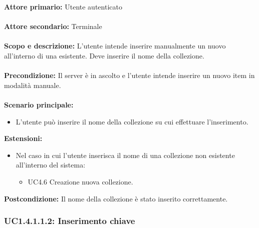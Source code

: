 \documentclass{scalatekids-article}
\begin{document}
\textbf{Attore primario:} Utente autenticato\\ \\
\textbf{Attore secondario:} Terminale\\ \\
\textbf{Scopo e descrizione:} L'utente intende inserire manualmente un nuovo  all'interno di una  esistente. Deve inserire il nome della collezione.\\ \\
\textbf{Precondizione:} Il server è in ascolto e l'utente intende inserire un nuovo item in modalità manuale.\\ \\
\textbf{Scenario principale:}
\begin{itemize}
\item L'utente può inserire il nome della collezione su cui effettuare l'inserimento.
\end{itemize}
\textbf{Estensioni:}
\begin{itemize}
\item Nel caso in cui l'utente inserisca il nome di una collezione non esistente all'interno del sistema:
  \begin{itemize}
  \item UC4.6 Creazione nuova collezione.
  \end{itemize}
\end{itemize}
\textbf{Postcondizione:} Il nome della collezione è stato inserito correttamente.

\subsubsection{UC1.4.1.1.2: Inserimento chiave}
\end{document}
